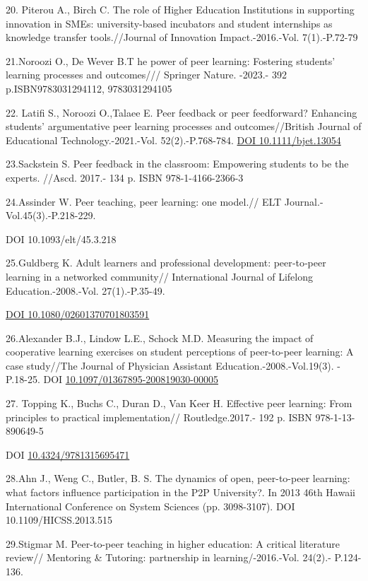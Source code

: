 20. Piterou A., Birch C. The role of Higher Education Institutions in
supporting innovation in SMEs: university-based incubators and student
internships as knowledge transfer tools.//Journal of Innovation
Impact.-2016.-Vol. 7(1).-P.72-79

21.Noroozi O., De Wever B.T he power of peer learning: Fostering
students' learning processes and outcomes/// Springer Nature. -2023.-
392 p.ISBN9783031294112, 9783031294105

22. Latifi S., Noroozi O.,Talaee E. Peer feedback or peer feedforward?
Enhancing students' argumentative peer learning processes and
outcomes//British Journal of Educational Technology.-2021.-Vol.
52(2).-P.768-784. \href{https://doi.org/10.1111/bjet.13054}{DOI
10.1111/bjet.13054}

23.Sackstein S. Peer feedback in the classroom: Empowering students to
be the experts. //Ascd. 2017.- 134 p. ISBN 978-1-4166-2366-3

24.Assinder W. Peer teaching, peer learning: one model.// ELT
Journal.-Vol.45(3).-P.218-229.

DOI 10.1093/elt/45.3.218

25.Guldberg K. Adult learners and professional development: peer‐to‐peer
learning in a networked community// International Journal of Lifelong
Education.-2008.-Vol. 27(1).-P.35-49.

\href{https://doi.org/10.1080/02601370701803591}{DOI
10.1080/02601370701803591}

26.Alexander B.J., Lindow L.E., Schock M.D. Measuring the impact of
cooperative learning exercises on student perceptions of peer-to-peer
learning: A case study//The Journal of Physician Assistant
Education.-2008.-Vol.19(3). - P.18-25. DOI
\href{http://dx.doi.org/10.1097/01367895-200819030-00005}{10.1097/01367895-200819030-00005}

27. Topping K., Buchs C., Duran D., Van Keer H. Effective peer learning:
From principles to practical implementation// Routledge.2017.- 192 p.
ISBN 978-1-13-890649-5

DOI
\href{http://dx.doi.org/10.4324/9781315695471}{10.4324/9781315695471}

28.Ahn J., Weng C., Butler, B. S. The dynamics of open, peer-to-peer
learning: what factors influence participation in the P2P University?.
In 2013 46th Hawaii International Conference on System Sciences (pp.
3098-3107). DOI 10.1109/HICSS.2013.515

29.Stigmar M. Peer-to-peer teaching in higher education: A critical
literature review// Mentoring \& Tutoring: partnership in
learning/-2016.-Vol. 24(2).- P.124-136.

